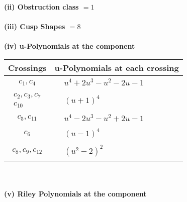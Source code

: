 \documentclass[1p]{elsarticle_modified}
\theoremstyle{definition}
\begin{document}
\flushleft \textbf{(ii) Obstruction class $= 1$}\\~\\
\flushleft \textbf{(iii) Cusp Shapes $= 8$}\\~\\
\newpage\renewcommand{\arraystretch}{1}
\flushleft \textbf{(iv) u-Polynomials at the component}\newline \\
\begin{tabular}{m{50pt}|m{274pt}}
Crossings & \hspace{64pt}u-Polynomials at each crossing \\
\hline $$\begin{aligned}c_{1},c_{4}\end{aligned}$$&$\begin{aligned}
&u^4+2 u^3- u^2-2 u-1
\end{aligned}$\\
\hline $$\begin{aligned}c_{2},c_{3},c_{7}\\c_{10}\end{aligned}$$&$\begin{aligned}
&(u+1)^4
\end{aligned}$\\
\hline $$\begin{aligned}c_{5},c_{11}\end{aligned}$$&$\begin{aligned}
&u^4-2 u^3- u^2+2 u-1
\end{aligned}$\\
\hline $$\begin{aligned}c_{6}\end{aligned}$$&$\begin{aligned}
&(u-1)^4
\end{aligned}$\\
\hline $$\begin{aligned}c_{8},c_{9},c_{12}\end{aligned}$$&$\begin{aligned}
&(u^2-2)^2
\end{aligned}$\\
\hline
\end{tabular}\\~\\
\newpage\renewcommand{\arraystretch}{1}
\flushleft \textbf{(v) Riley Polynomials at the component}\newline \\
\end{document}

